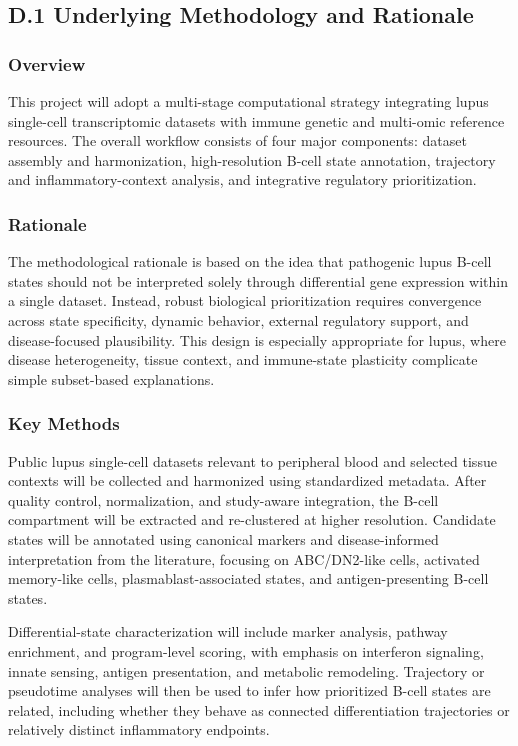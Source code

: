 \documentclass[12pt, a4paper]{article}
\begin{document}
\subsection*{D.1 Underlying Methodology and Rationale}

\subsubsection*{Overview}
This project will adopt a multi-stage computational strategy integrating lupus single-cell transcriptomic datasets with immune genetic and multi-omic reference resources. The overall workflow consists of four major components: dataset assembly and harmonization, high-resolution B-cell state annotation, trajectory and inflammatory-context analysis, and integrative regulatory prioritization.

\subsubsection*{Rationale}
The methodological rationale is based on the idea that pathogenic lupus B-cell states should not be interpreted solely through differential gene expression within a single dataset. Instead, robust biological prioritization requires convergence across state specificity, dynamic behavior, external regulatory support, and disease-focused plausibility. This design is especially appropriate for lupus, where disease heterogeneity, tissue context, and immune-state plasticity complicate simple subset-based explanations.

\subsubsection*{Key Methods}
Public lupus single-cell datasets relevant to peripheral blood and selected tissue contexts will be collected and harmonized using standardized metadata. After quality control, normalization, and study-aware integration, the B-cell compartment will be extracted and re-clustered at higher resolution. Candidate states will be annotated using canonical markers and disease-informed interpretation from the literature, focusing on ABC/DN2-like cells, activated memory-like cells, plasmablast-associated states, and antigen-presenting B-cell states.

Differential-state characterization will include marker analysis, pathway enrichment, and program-level scoring, with emphasis on interferon signaling, innate sensing, antigen presentation, and metabolic remodeling. Trajectory or pseudotime analyses will then be used to infer how prioritized B-cell states are related, including whether they behave as connected differentiation trajectories or relatively distinct inflammatory endpoints.
\end{document}
